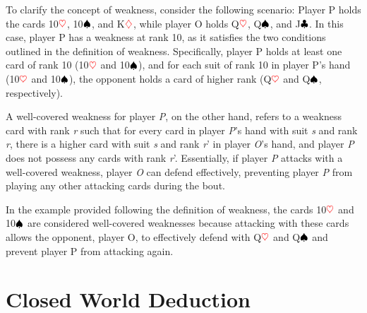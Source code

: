 To clarify the concept of weakness, consider the following scenario: Player P holds the cards 10$\textcolor{red}{\heartsuit}$, 10$\textcolor{black}{\spadesuit}$, and K$\textcolor{red}{\diamondsuit}$, while player O holds Q$\textcolor{red}{\heartsuit}$, Q$\textcolor{black}{\spadesuit}$, and J$\textcolor{black}{\clubsuit}$. In this case, player P has a weakness at rank 10, as it satisfies the two conditions outlined in the definition of weakness. Specifically, player P holds at least one card of rank 10 (10$\textcolor{red}{\heartsuit}$ and 10$\textcolor{black}{\spadesuit}$), and for each suit of rank 10 in player P's hand (10$\textcolor{red}{\heartsuit}$ and 10$\textcolor{black}{\spadesuit}$), the opponent holds a card of higher rank (Q$\textcolor{red}{\heartsuit}$ and Q$\textcolor{black}{\spadesuit}$, respectively).

A well-covered weakness for player \textit{P}, on the other hand, refers to a weakness card with rank \textit{r} such that for every card in player \textit{P}'s hand with suit \textit{s} and rank \textit{r}, there is a higher card with suit \textit{s} and rank \textit{r}' in player \textit{O}'s hand, and player \textit{P} does not possess any cards with rank \textit{r}'. Essentially, if player \textit{P} attacks with a well-covered weakness, player \textit{O} can defend effectively, preventing player \textit{P} from playing any other attacking cards during the bout.

In the example provided following the definition of weakness, the cards 10$\textcolor{red}{\heartsuit}$ and 10$\textcolor{black}{\spadesuit}$ are considered well-covered weaknesses because attacking with these cards allows the opponent, player O, to effectively defend with Q$\textcolor{red}{\heartsuit}$ and Q$\textcolor{black}{\spadesuit}$ and prevent player P from attacking again.

\section{Closed World Deduction}


